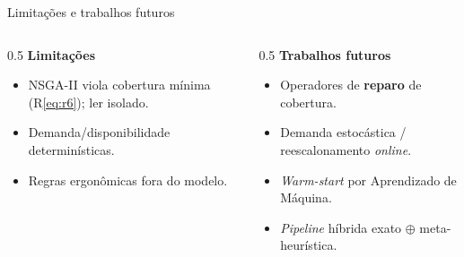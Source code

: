 \begin{frame}{Limitações e trabalhos futuros}
    \begin{columns}[T]
        \begin{column}{0.5\textwidth}
            \textbf{Limitações}
            \begin{footnotesize}
                \begin{itemize}
                    \item NSGA-II viola cobertura mínima (R\ref{eq:r6}); ler isolado.
                    \item Demanda/disponibilidade determinísticas.
                    \item Regras ergonômicas fora do modelo.
                \end{itemize}
            \end{footnotesize}
        \end{column}
        \begin{column}{0.5\textwidth}
            \textbf{Trabalhos futuros}
            \begin{footnotesize}
                \begin{itemize}
                    \item Operadores de \textbf{reparo} de cobertura.
                    \item Demanda estocástica / reescalonamento \textit{online}.
                    \item \textit{Warm-start} por Aprendizado de Máquina.
                    \item \textit{Pipeline} híbrida exato \(\oplus\) meta-heurística.
                \end{itemize}
            \end{footnotesize}
        \end{column}
    \end{columns}

    \vspace{0.6em}
\end{frame}
